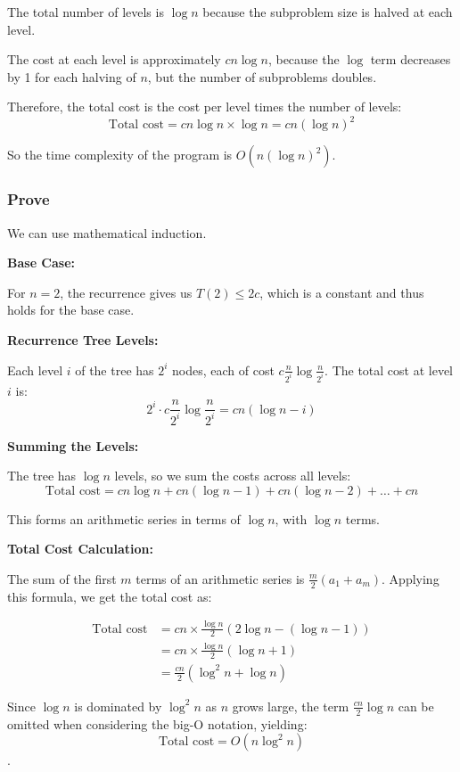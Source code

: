 \documentclass{article}
\begin{document}
The total number of levels is \( \log n \) because the subproblem size is halved at each level.

The cost at each level is approximately \( cn\log n \), because the \( \log \) term decreases by 1 for each halving of \( n \), but the number of subproblems doubles.

Therefore, the total cost is the cost per level times the number of levels:
\[ \text{Total cost} = cn\log n \times \log n = cn(\log n)^2 \]

So the time complexity of the program is \( O(n(\log n)^2) \).


\subsubsection*{Prove}
We can use mathematical induction. 

\textbf{Base Case:}

For \( n = 2 \), the recurrence gives us \( T(2) \leq 2c \), which is a constant and thus holds for the base case.

\textbf{Recurrence Tree Levels:}

Each level \( i \) of the tree has \( 2^i \) nodes, each of cost \( c\frac{n}{2^i}\log\frac{n}{2^i} \). The total cost at level \( i \) is:
\[ 2^i \cdot c\frac{n}{2^i}\log\frac{n}{2^i} = cn(\log n - i) \]

\textbf{Summing the Levels:}

The tree has \( \log n \) levels, so we sum the costs across all levels:
\[ \text{Total cost} = cn\log n + cn(\log n - 1) + cn(\log n - 2) + \ldots + cn \]

This forms an arithmetic series in terms of \( \log n \), with \( \log n \) terms.

\textbf{Total Cost Calculation:}

The sum of the first \( m \) terms of an arithmetic series is \( \frac{m}{2}(a_1 + a_m) \). Applying this formula, we get the total cost as:

\begin{align*}
\text{Total cost} &= cn \times \frac{\log n}{2}(2\log n - (\log n - 1)) \\
&= cn \times \frac{\log n}{2}(\log n + 1) \\
&= \frac{cn}{2}(\log^2 n + \log n)
\end{align*}

Since \( \log n \) is dominated by \( \log^2 n \) as \( n \) grows large, the term \( \frac{cn}{2}\log n \) can be omitted when considering the big-O notation, yielding:
\[ \text{Total cost} = O(n\log^2 n) \].
\end{document}
